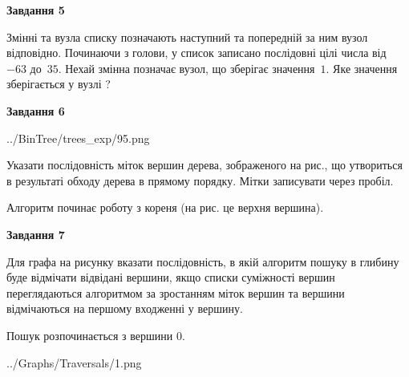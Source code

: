 \documentclass[12pt, ukrainian]{article}
\begin{document}
{\begin {large}
{\begin {center}\textbf{Завдання 5}\end {center}}\par
Змінні  та  вузла списку позначають наступний та попередній за ним вузол відповідно. Починаючи з голови, у список записано послідовні цілі числа від~$-63$ до~$35$. Нехай змінна  позначає вузол, що зберігає значення~$1$.
Яке значення зберігається у вузлі  ?\par
\newpage

{\begin {center}\textbf{Завдання 6}\end {center}}\par

\begin{center}
	{../BinTree/trees_exp/95.png}
\end{center}
Указати послідовність міток вершин дерева, зображеного на рис., що утвориться в результаті обходу дерева в прямому порядку. Мітки записувати через пробіл.\par Алгоритм починає роботу з кореня (на рис. це верхня вершина).\par
\newpage

{\begin {center}\textbf{Завдання 7}\end {center}}\par
Для графа на рисунку вказати послідовність, в якій алгоритм пошуку в глибину буде відмічати відвідані вершини, якщо списки суміжності вершин переглядаються алгоритмом за зростанням міток вершин та вершини відмічаються на першому вход\-женні у вершину.\par
Пошук розпочинається з вершини 0.\par

\begin{center}
	{../Graphs/Traversals/1.png}
\end{center}\par
\newpage


\end{large}}
\end{document}
